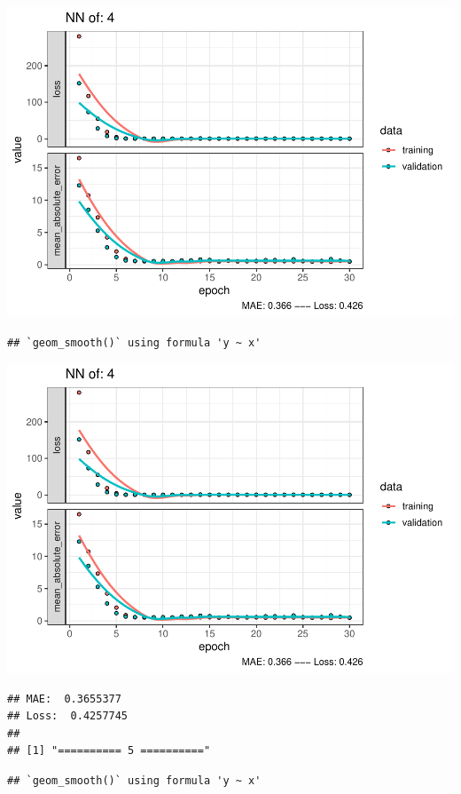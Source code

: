\documentclass[
]{article}
\begin{document}
\includegraphics{project-code_files/figure-latex/unnamed-chunk-18-7.pdf}

\begin{verbatim}
## `geom_smooth()` using formula 'y ~ x'
\end{verbatim}

\includegraphics{project-code_files/figure-latex/unnamed-chunk-18-8.pdf}

\begin{verbatim}
## MAE:  0.3655377
## Loss:  0.4257745 
## 
## [1] "========== 5 =========="
\end{verbatim}

\begin{verbatim}
## `geom_smooth()` using formula 'y ~ x'
\end{verbatim}
\end{document}
